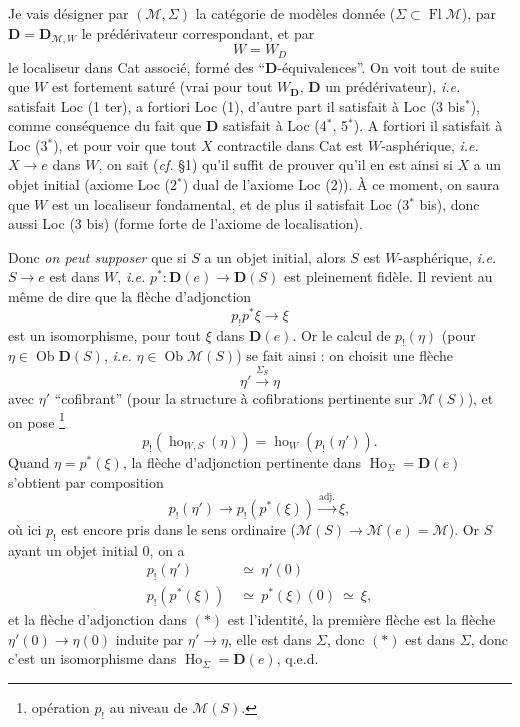 Je vais désigner par $(\mathcal{M},\Sigma)$ la catégorie de modèles donnée ($\Sigma\subset\operatorname{Fl}\mathcal{M}$), par $\mathbf{D}=\mathbf{D}_{\mathcal{M},W}$ le prédérivateur correspondant, et par
\[ W=W_D \] %
le localiseur dans Cat associé, formé des ``$\mathbf{D}$-équivalences''. On voit tout de suite que $W$ est fortement saturé (vrai pour tout $W_{\mathbf{D}}$, $\mathbf{D}$ un prédérivateur), \textit{i.e.} satisfait Loc (1 ter), a fortiori Loc (1), d'autre part il satisfait à Loc (3 bis$^*$), comme conséquence du fait que $\mathbf{D}$ satisfait à Loc (4$^*$, 5$^*$). A fortiori il satisfait à Loc (3$^*$), et pour voir que tout $X$ contractile dans Cat est $W$-asphérique, \textit{i.e.} $X\longrightarrow e$ dans $W$, on sait (\textit{cf.} §1)
qu'il suffit de prouver qu'il en est ainsi si $X$ a un objet initial (axiome Loc (2$^*$) dual de l'axiome Loc (2)). À ce moment, on saura que $W$ est un localiseur fondamental, et de plus il satisfait Loc (3$^*$ bis), donc aussi Loc (3 bis) (forme forte de l'axiome de localisation).

Donc \textit{on peut supposer} que si $S$ a un objet initial, alors $S$ est $W$-asphérique, \textit{i.e.} $S\longrightarrow e$ est dans $W$, \textit{i.e.} $p^*:\mathbf{D}(e)\longrightarrow\mathbf{D}(S)$ est pleinement fidèle. Il revient au même de dire que la flèche d'adjonction
\[ p_!p^*\xi\longrightarrow\xi \]
est un isomorphisme, pour tout $\xi$ dans $\mathbf{D}(e)$. Or le calcul de $p_!(\eta)$ (pour $\eta\in\operatorname{Ob}\mathbf{D}(S)$, \textit{i.e.} $\eta\in\operatorname{Ob}\mathcal{M}(S)$) se fait ainsi : on choisit une flèche
\[ \eta'\xrightarrow{\Sigma_S}\eta \]
avec $\eta'$ ``cofibrant'' (pour la structure à cofibrations pertinente sur $\mathcal{M}(S)$), et on
pose \footnote[54]{opération $p_!$ au niveau de $\mathcal{M}(S)$.}
\[ p_!(\operatorname{ho}_{W,S}(\eta))=\operatorname{ho}_W(p_!(\eta')). \]
Quand $\eta=p^*(\xi)$, la flèche d'adjonction pertinente dans $\operatorname{Ho}_\Sigma=\mathbf{D}(e)$ s'obtient par composition
\[ p_!(\eta')\longrightarrow p_!(p^*(\xi))\xrightarrow{\text{adj.}}\xi, \tag*{$(*)$} \]
où ici $p_!$ est encore pris dans le sens ordinaire ($\mathcal{M}(S)\longrightarrow\mathcal{M}(e)=\mathcal{M}$). Or $S$ ayant un objet initial 0, on a
\[ \begin{aligned}
p_!(\eta') &\ \simeq\ \eta'(0)\\
p_!(p^*(\xi)) &\ \simeq\ p^*(\xi)(0)\ \simeq\ \xi,
\end{aligned} \]
et la flèche d'adjonction dans $(*)$ est l'identité, la première flèche est la flèche $\eta'(0)\longrightarrow\eta(0)$ induite par $\eta'\longrightarrow\eta$, elle est dans $\Sigma$, donc $(*)$ est dans $\Sigma$, donc c'est un isomorphisme dans $\operatorname{Ho}_\Sigma=\mathbf{D}(e)$, q.e.d.

